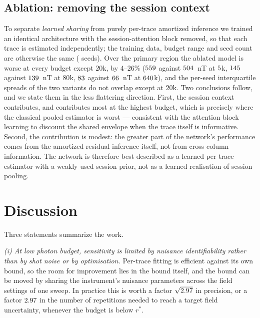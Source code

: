 \documentclass[aps,pra,twocolumn,superscriptaddress,nofootinbib]{revtex4-2}
\begin{document}
\subsection{Ablation: removing the session context}
\label{sec:ablation}

To separate \emph{learned sharing} from purely per-trace amortized inference we trained an
identical architecture with the session-attention block removed, so that each trace is
estimated independently; the training data, budget range and seed count are otherwise the
same (\nSeedsAblation{} seeds). Over the primary region the ablated model is worse at every
budget except $20$k, by $4$--$26\%$
($559$ against $504$~nT at $5$k, $145$ against
$139$~nT at $80$k, $83$ against $66$~nT at
$640$k), and the per-seed interquartile spreads of the two variants do not overlap
except at $20$k. Two conclusions follow, and we state them in the less flattering
direction. First, the session context contributes, and contributes most at the highest
budget, which is precisely where the classical pooled estimator is worst --- consistent with
the attention block learning to discount the shared envelope when the trace itself is
informative. Second, the contribution is modest: the greater part of the network's
performance comes from the amortized residual inference itself, not from cross-column
information. The network is therefore best described as a learned per-trace estimator with a
weakly used session prior, not as a learned realisation of session pooling.

\section{Discussion}

Three statements summarize the work.

\emph{(i) At low photon budget, sensitivity is limited by nuisance identifiability rather
than by shot noise or by optimisation.} Per-trace fitting is efficient against its own
bound, so the room for improvement lies in the bound itself, and the bound can be moved by
sharing the instrument's nuisance parameters across the field settings of one sweep. In
practice this is worth a factor $\sqrt{2.97}$ in precision, or a factor
$2.97$ in the number of repetitions needed to reach a target field
uncertainty, whenever the budget is below $r^{*}$.
\end{document}
